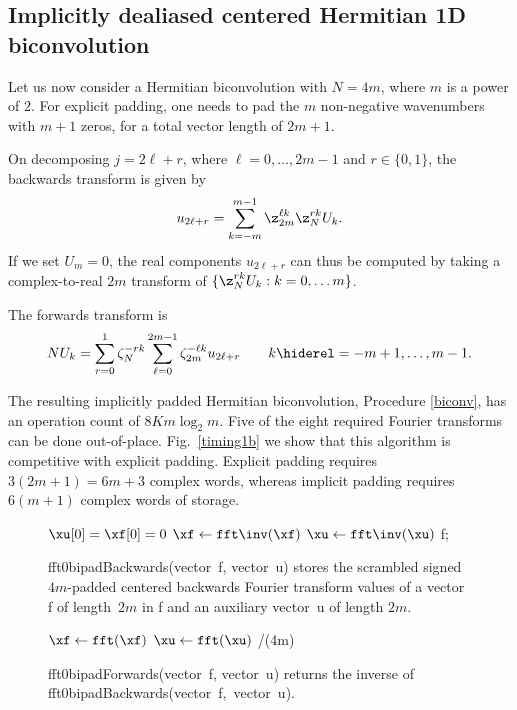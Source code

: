\documentclass[final]{siamltex}
\def\be{\begin{dmath*}}
\def\ee{\end{dmath*}}
\def\bec{\begin{dmath*}[compact]}
\let\eec\ee
\def\no{\hiderel}
\begin{document}
\subsection{Implicitly dealiased centered Hermitian 1D biconvolution}
Let us now consider a Hermitian biconvolution with $N=4m$, where $m$ is a
power of $2$. For explicit padding, one needs to pad the $m$ non-negative
wavenumbers with $m+1$ zeros, for a total vector length of $2m+1$.

On decomposing $j=2\ell+r$, where
$\ell=0,\ldots, 2m-1$ and $r\in\{0,1\}$, the backwards transform is given
by
\bec
u_{2\ell +r}=\sum_{k=-m}^{m-1} \z_{2m}^{\ell k} \z_N^{rk} U_k.
\eec
If we set $U_m=0$, the real components $u_{2\ell +r}$ can thus be computed
by taking a complex-to-real $2m$ transform of
$\{\z_N^{rk} U_k : k=0,\ldots m\}$.

The forwards transform is
\be
NU_k=\sum_{r=0}^{1}\zeta_N^{-rk}
\sum_{\ell=0}^{2m-1} \zeta_{2m}^{-\ell k} u_{2\ell+r}
\qquad k\no =-m+1,\ldots,m-1.
\ee

The resulting implicitly padded Hermitian biconvolution,
Procedure \ref{biconv}, has an operation count of $8Km\log_2 m$. 
Five of the eight required Fourier transforms can be done out-of-place.
Fig.~\ref{timing1b} we show that this algorithm is competitive with
explicit padding. Explicit padding requires $3(2m+1)=6m+3$ complex words,
whereas implicit padding requires $6(m+1)$ complex words of storage.

\begin{figure}[htbp]
\begin{minipage}{0.51\linewidth}
\begin{procedure}[H]
  $\xu[0]=\xf[0]=0$\;
  $\xf \leftarrow \fft\inv(\xf)$\;
  $\xu \leftarrow \fft\inv(\xu)$\;
  \Return f;
  \caption{fft0bipadBackwards(vector~{\sf f}, vector~{\sf u}) stores the 
scrambled signed~$4m$-padded centered backwards Fourier transform values of a
vector {\sf f} of length~$2m$ in {\sf f} and an auxiliary vector~{\sf u} of
length $2m$.}\label{fft0bipadBackwards}
\end{procedure}
\end{minipage}
%
\begin{minipage}{0.49\linewidth}
\begin{function}[H]
  $\xf \leftarrow \fft(\xf)$\;
  $\xu \leftarrow \fft(\xu)$\;
  \Return \xf/(4m)\;
  \caption{fft0bipadForwards(vector~{\sf f}, vector~{\sf u}) returns the
inverse of fft0bipadBackwards(\hbox{vector~{\sf f}, vector~{\sf u}}).}
\label{fft0bipadForwards}
\end{function}
\end{minipage}
\end{figure}
\end{document}
